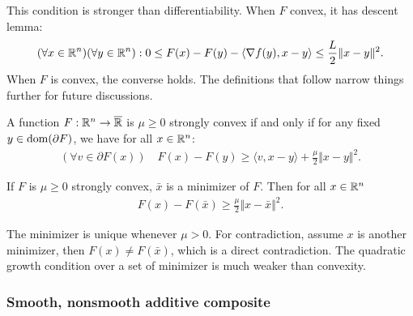 \documentclass[12pt]{article}
\begin{document}
        This condition is stronger than differentiability. 
        When $F$ convex, it has descent lemma: 
        \begin{align*}
            (\forall x \in \mathbb R^n)(\forall y \in \mathbb R^n): 0 \le 
            F(x) - F(y) - \langle \nabla f(y), x - y\rangle \le \frac{L}{2}\Vert x - y\Vert^2. 
        \end{align*}
        When $F$ is convex, the converse holds. 
        The definitions that follow narrow things further for future discussions. 
        \begin{definition}
            A function $F:\mathbb R^n \rightarrow \overline {\mathbb R}$ is $\mu \ge 0$ strongly convex if and only if for any fixed $y \in \operatorname{dom}(\partial F)$, we have for all $x\in \mathbb R^n$: 
            \begin{align*}
                (\forall v \in \partial F(x))\quad 
                F(x) - F(y) \ge \langle v, x - y\rangle + \frac{\mu}{2}\Vert x - y\Vert^2. 
            \end{align*}
        \end{definition}
        \begin{lemma}
            If $F$ is $\mu \ge 0$ strongly convex, $\bar x$ is a minimizer of $F$. 
            Then for all $x \in \mathbb R^n$
            \begin{align*}
                F(x) - F(\bar x) \ge \frac{\mu}{2}\Vert x - \bar x\Vert^2. 
            \end{align*}
        \end{lemma}
        \begin{remark}
            The minimizer is unique whenever $\mu > 0$. 
            For contradiction, assume $x$ is another minimizer, then $F(x) \neq F(\bar x)$, which is a direct contradiction. 
            The quadratic growth condition over a set of minimizer is much weaker than convexity. 
        \end{remark}
        
        \subsubsection{Smooth, nonsmooth additive composite}\label{sssec:additive-composite}
\end{document}
